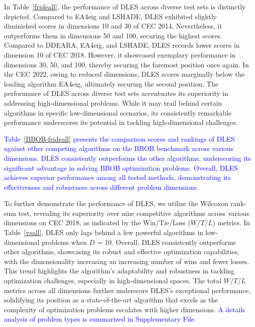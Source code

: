 \documentclass[journal,twoside]{IEEEtran}
\begin{document}
In Table~\ref{frideall}, the performance of DLES across diverse test sets is distinctly depicted. Compared to EA4eig and LSHADE, DLES exhibited slightly diminished scores in dimensions 10 and 30 of CEC 2014. Nevertheless, it outperforms them in dimensions 50 and 100, securing the highest scores. Compared to DDEARA, EA4eig, and LSHADE, DLES records lower scores in dimension 10 of CEC 2018. However, it showcased exemplary performance in dimensions 30, 50, and 100, thereby securing the foremost position once again. In the CEC 2022, owing to reduced dimensions, DLES scores marginally below the leading algorithm EA4eig, ultimately securing the second position. The performance of DLES across diverse test sets accentuates its superiority in addressing high-dimensional problems. While it may trail behind certain algorithms in specific low-dimensional scenarios, its consistently remarkable performance underscores its potential in tackling high-dimensional challenges. 

\textcolor{blue}{Table~\ref{BBOB-frideall} presents the comparison scores and rankings of DLES against other competing algorithms on the BBOB benchmark across various dimensions. DLES consistently outperforms the other algorithms, underscoring its significant advantage in solving BBOB optimization problems. Overall, DLES achieves superior performance among all tested methods, demonstrating its effectiveness and robustness across different problem dimensions.}

To further demonstrate the performance of DLES, we utilize the Wilcoxon rank-sum test, revealing its superiority over nine competitive algorithms across various dimensions on CEC 2018, as indicated by the Win/Tie/Loss ($W/T/L$) metrics. In Table~\ref{vsall}, DLES only lags behind a few powerful algorithms in low-dimensional problems when $D$ = 10. Overall, DLES consistently outperforms other algorithms, showcasing its robust and effective optimization capabilities, with the dimensionality increasing an increasing number of wins and fewer losses. This trend highlights the algorithm's adaptability and robustness in tackling optimization challenges, especially in high-dimensional spaces. The total $W/T/L$ metrics across all dimensions further underscore DLES's exceptional performance, solidifying its position as a state-of-the-art algorithm that excels as the complexity of optimization problems escalates with higher dimensions. \textcolor{blue}{A details analysis of problem types is summarized in Supplementary File.}
\end{document}
